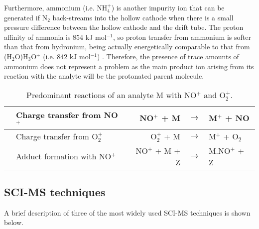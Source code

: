 Furthermore, ammonium (i.e. NH$_4^+$) is another impurity ion that can be generated if N$_2$ back-streams into the hollow cathode when there is a small pressure difference between the hollow cathode and the drift tube. %
The proton affinity of ammonia is 854 kJ mol$^{-1}$, so proton transfer from ammonium is softer than that from hydronium, being actually energetically comparable to that from (H$_2$O)H$_3$O$^+$ (i.e. 842 kJ mol$^{-1}$)  \cite{doi:10.1063/1.556018}. 
%
Therefore, the presence of trace amounts of ammonium does not represent a problem as the main product ion arising from its reaction with the analyte will be the protonated parent molecule.
%
%

\begin{table}[t]
\centering
\caption{Predominant reactions of an analyte M with NO$^+$ and O$_2^+$.}%
\label{tb:ct}
\begin{tabular}{ll rcl}
\toprule
\qquad& Charge transfer from NO$^+$ & NO$^+$ + M&$\rightarrow$&M$^+$ + NO
\\ \midrule
&Charge transfer from O$_2^+$ & O$_2^+$ + M&$\rightarrow$&M$^+$ + O$_2$
\\ \midrule
&Adduct formation with NO$^+$ & NO$^+$ + M + Z&$\rightarrow$&M.NO$^+$ + Z
\\ \bottomrule
\end{tabular}
\end{table}









\subsection{SCI-MS techniques}


A brief description of three of the most widely used SCI-MS techniques is shown below.


